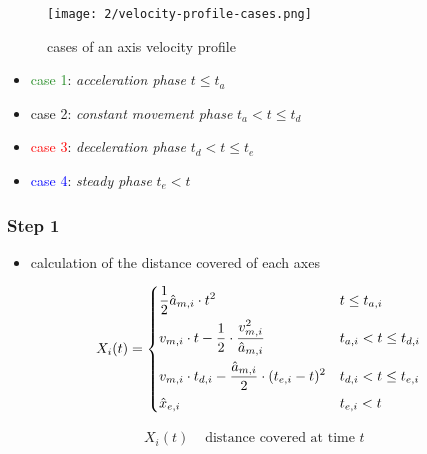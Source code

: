 \documentclass[%
  professionalfonts,%
  xcolor={%
    usenames,%
    dvipsnames,%
    svgnames,%
    table,%
    hyperref%
  }%
]{beamer}
\begin{document}
\begin{frame}
  \begin{figure}[h]
    \texttt{[image: 2/velocity-profile-cases.png]}
    \caption{cases of an axis velocity profile}
    \label{fig:ti-movement-cases}
  \end{figure}
  
  \begin{itemize}
    \item \textcolor{ForestGreen}{case 1}: \emph{acceleration phase} $t \leq t_{a}$
    \item \textcolor{Dandelion}{case 2}: \emph{constant movement phase} $t_{a} < t \leq t_{d}$
    \item \textcolor{red}{case 3}: \emph{deceleration phase} $t_{d} < t \leq t_{e}$
    \item \textcolor{blue}{case 4}: \emph{steady phase} $t_{e} < t$
  \end{itemize}
\end{frame}

\subsubsection{Step 1}
\begin{frame}
\begin{itemize}
  \item calculation of the distance covered of each axes
\end{itemize}
\begin{equation*}
X_{i}(t) = 
\begin{dcases}
\frac{1}{2} \hat{a}_{m,i} \cdot t^2  & t \leq t_{a,i} \\
v_{m,i} \cdot t - \frac{1}{2} \cdot \frac{v_{m,i}^2}{\hat{a}_{m,i}} & t_{a,i} < t \leq t_{d,i} \\
v_{m,i} \cdot t_{d,i} - \frac{\hat{a}_{m,i}}{2} \cdot (t_{e,i} - t)^2 & t_{d,i} < t \leq t_{e,i}\\
\hat{x}_{e,i} & t_{e,i} < t\\
\end{dcases}
\end{equation*}

\begin{align*}
X_{i}(t) & \text{ distance covered at time $t$ } \\
\end{align*}
\end{frame}
\end{document}
